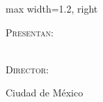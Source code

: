 \begin{titlepage}
\begin{adjustbox}{max width=1.2\linewidth, right}
\begin{minipage}[c][0.99\textheight][t]{0.95\textwidth}
            \vspace{60pt}
            {\fontsize{14}{14}\selectfont\textsc{Presentan:\\}}
            \vspace{10pt}
            {\fontsize{14}{14}\selectfont\textbf{\authorname\\}}

            \vspace{60pt}
            {\fontsize{14}{14}\selectfont\textsc{Director:\\}}
            \vspace{10pt}
            {\fontsize{14}{14}\selectfont\textbf{\thesisdirectors}}

            \vfill
            {\fontsize{12}{12}\selectfont Ciudad de México\\}
            {\fontsize{12}{12}\selectfont \thesisdate\\}
            \vspace{40pt}
        \end{minipage}
    \end{adjustbox}
\end{titlepage}